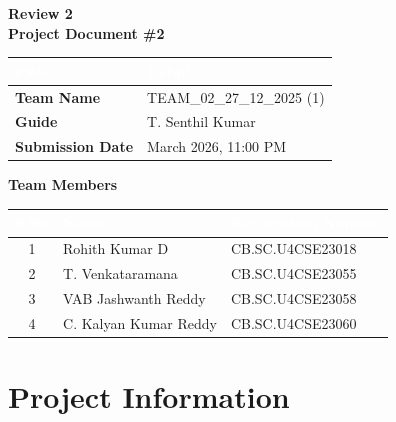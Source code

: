 \documentclass[12pt,a4paper]{article}
\begin{document}
\begin{titlepage}
\centering
\vspace*{1cm}

{\Huge \textbf{Review 2}}\\[0.5cm]
{\LARGE \textbf{Project Document \#2}}\\[2cm]

\begin{table}[H]
\centering
\renewcommand{\arraystretch}{1.8}
\begin{tabularx}{0.9\textwidth}{|>{\hsize=0.8\hsize}X|>{\hsize=1.2\hsize}X|}
\hline
\rowcolor{headerblue}
\textcolor{white}{\textbf{Field}} & \textcolor{white}{\textbf{Details}} \\
\hline
\textbf{Team Name} & TEAM\_02\_27\_12\_2025 (1) \\
\hline
\textbf{Guide} & T. Senthil Kumar \\
\hline
\textbf{Submission Date} & 1 March 2026, 11:00 PM \\
\hline
\end{tabularx}
\end{table}

\vspace{1cm}

{\Large \textbf{Team Members}}\\[0.5cm]

\begin{table}[H]
\centering
\renewcommand{\arraystretch}{1.6}
\begin{tabularx}{0.9\textwidth}{|c|X|X|}
\hline
\rowcolor{headerblue}
\textcolor{white}{\textbf{S.No}} & \textcolor{white}{\textbf{Name}} & \textcolor{white}{\textbf{Registration Number}} \\
\hline
1 & Rohith Kumar D & CB.SC.U4CSE23018 \\
\hline
2 & T. Venkataramana & CB.SC.U4CSE23055 \\
\hline
3 & VAB Jashwanth Reddy & CB.SC.U4CSE23058 \\
\hline
4 & C. Kalyan Kumar Reddy & CB.SC.U4CSE23060 \\
\hline
\end{tabularx}
\end{table}

\vfill

\end{titlepage}

\newpage
\setcounter{page}{1}
\tableofcontents
\newpage

\section*{Project Information}
\end{document}
